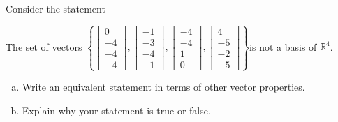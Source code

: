 
\begin{exerciseStatement}


Consider the statement 
\begin{center}\begin{minipage}{0.8\textwidth}
 The set of vectors \( \left\{ \left[\begin{array}{c}
0 \\
-4 \\
-4 \\
-4
\end{array}\right] , \left[\begin{array}{c}
-1 \\
-3 \\
-4 \\
-1
\end{array}\right] , \left[\begin{array}{c}
-4 \\
-4 \\
1 \\
0
\end{array}\right] , \left[\begin{array}{c}
4 \\
-5 \\
-2 \\
-5
\end{array}\right] \right\} \)is not a basis of \(\mathbb{R}^4\). 
\end{minipage}\end{center}
    


\begin{enumerate}[(a)]
\item  Write an equivalent statement in terms of other vector properties.
\item  Explain why your statement is true or false.
\end{enumerate}
    
\end{exerciseStatement}
    
